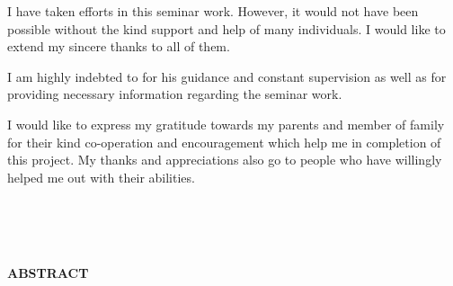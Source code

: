 I have taken efforts in this seminar work. However, it would not have been possible
without the kind support and help of many individuals. I would like to extend my sincere thanks to all of them.

I am highly indebted to \textbf{\guideName} for his guidance and constant supervision as well as for providing necessary information regarding the seminar work.

I would like to express my gratitude towards my parents and member of family for their kind co-operation and encouragement which help me in completion of this project.
My thanks and appreciations also go to people who have willingly helped me out with
their abilities.


\begin{flushright}
\textbf{\studentNameone}\\
\textbf{\studentNametwo}\\
\textbf{\studentNamethree}\\
\textbf{\studentNamefour}
\end{flushright}


\newpage
{}
\begin{center}
{\LARGE \bf ABSTRACT}\\
\end{center}
\vspace{0.8cm}


